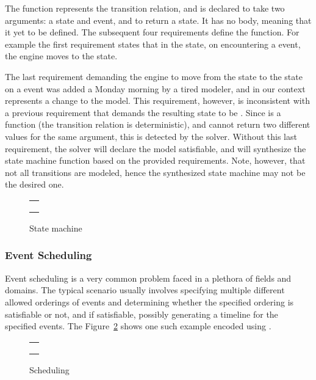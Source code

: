 The function  represents the transition relation, and 
is declared to take two arguments: a state and event, and to return a state. 
It has no body, meaning that it yet to be defined. The subsequent four  
requirements define the 
 function. For example the first requirement states that
in the  state, on encountering a  event, the engine moves 
to the  state. 

The last requirement demanding the engine to move from the  state to 
the  state on a  event was added a Monday morning by a tired
modeler, and in our context represents a change to the model.
This requirement, however, is inconsistent with a previous requirement 
that demands the resulting state to be .
Since  is a function (the transition relation is deterministic), and 
cannot return two
different values for the same argument, this is detected by the solver. 
Without this last requirement, the solver will declare the model satisfiable, and 
will synthesize the state machine function based on the provided requirements.
Note, however, that not all transitions are modeled, hence the synthesized state
machine may not be the desired one.

\begin{figure}
\centering
\begin{tabular}{c}
\hline \\
 \\ \\
\hline
\end{tabular}
\caption{State machine}
\label{fig:statemachine}
\end{figure}

\subsubsection{Event Scheduling}

Event scheduling is a very common problem faced in a plethora of
fields and domains. The typical scenario usually involves specifying
multiple different allowed orderings of events and determining whether
the specified ordering is satisfiable or not, and if satisfiable,
possibly generating a timeline for the specified events. The
Figure~\ref{fig:scheduling} shows one such example encoded using
\Klang{}.

\begin{figure}
\centering
\begin{tabular}{c}
\hline \\
 \\ \\
\hline
\end{tabular}
\caption{Scheduling}
\label{fig:scheduling}
\end{figure}

